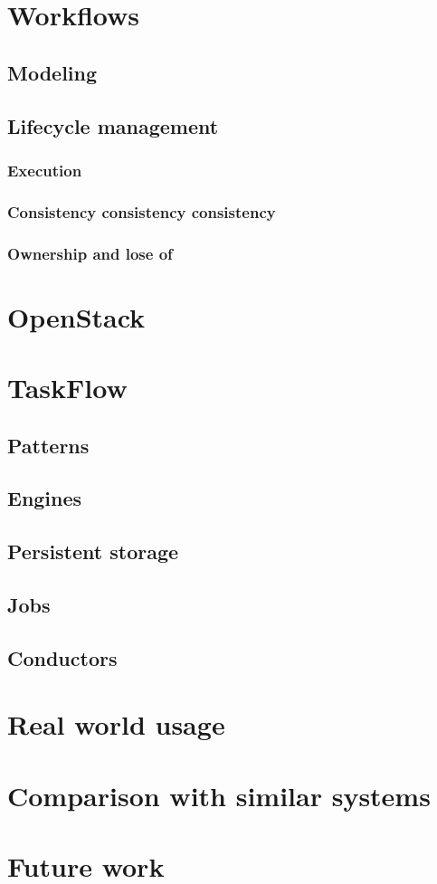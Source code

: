 \documentclass[11pt,a4paper]{article}
\begin{document}
\section{Workflows}

\subsection{Modeling}

\subsection{Lifecycle management}

\subsubsection{Execution}

\subsubsection{Consistency consistency consistency}

\subsubsection{Ownership and lose of}

\section{OpenStack}

\section{TaskFlow}

\subsection{Patterns}

\subsection{Engines}

\subsection{Persistent storage}

\subsection{Jobs}

\subsection{Conductors}

\section{Real world usage}

\section{Comparison with similar systems}

\section{Future work}
\end{document}
